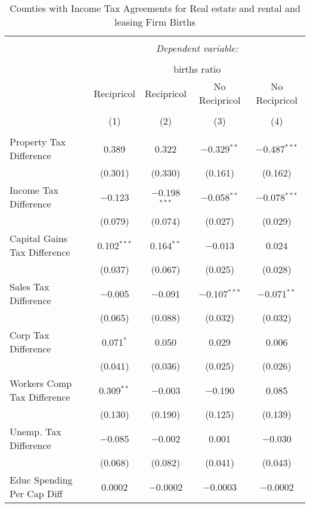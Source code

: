 
\begin{table}[!htbp] \centering 
  \caption{Counties with Income Tax Agreements for  Real estate and rental and leasing Firm Births} 
  \label{53rd} 
\begin{tabular}{@{\extracolsep{5pt}}lcccc} 
\\[-1.8ex]\hline 
\hline \\[-1.8ex] 
 & \multicolumn{4}{c}{\textit{Dependent variable:}} \\ 
\cline{2-5} 
\\[-1.8ex] & \multicolumn{4}{c}{births ratio} \\ 
 & Recipricol & Recipricol & No Recipricol & No Recipricol \\ 
\\[-1.8ex] & (1) & (2) & (3) & (4)\\ 
\hline \\[-1.8ex] 
 Property Tax Difference & 0.389 & 0.322 & $-$0.329$^{**}$ & $-$0.487$^{***}$ \\ 
  & (0.301) & (0.330) & (0.161) & (0.162) \\ 
  Income Tax Difference & $-$0.123 & $-$0.198$^{***}$ & $-$0.058$^{**}$ & $-$0.078$^{***}$ \\ 
  & (0.079) & (0.074) & (0.027) & (0.029) \\ 
  Capital Gains Tax Difference & 0.102$^{***}$ & 0.164$^{**}$ & $-$0.013 & 0.024 \\ 
  & (0.037) & (0.067) & (0.025) & (0.028) \\ 
  Sales Tax Difference & $-$0.005 & $-$0.091 & $-$0.107$^{***}$ & $-$0.071$^{**}$ \\ 
  & (0.065) & (0.088) & (0.032) & (0.032) \\ 
  Corp Tax Difference & 0.071$^{*}$ & 0.050 & 0.029 & 0.006 \\ 
  & (0.041) & (0.036) & (0.025) & (0.026) \\ 
  Workers Comp Tax Difference & 0.309$^{**}$ & $-$0.003 & $-$0.190 & 0.085 \\ 
  & (0.130) & (0.190) & (0.125) & (0.139) \\ 
  Unemp. Tax Difference & $-$0.085 & $-$0.002 & 0.001 & $-$0.030 \\ 
  & (0.068) & (0.082) & (0.041) & (0.043) \\ 
  Educ Spending Per Cap Diff & 0.0002 & $-$0.0002 & $-$0.0003 & $-$0.0002 \\ 

\end{tabular}
\end{table}
